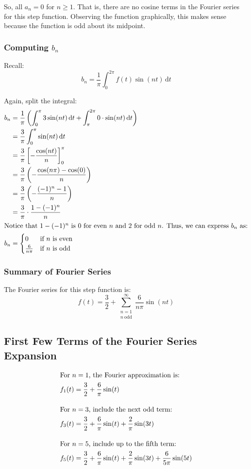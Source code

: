 \documentclass[10pt]{article} %
\begin{document}
So, all $a_n = 0$ for $n \geq 1$. That is, there are no cosine terms in the Fourier series for this step function. Observing the function graphically, this makes sense because the function is odd about its midpoint.

\subsubsection{Computing $b_n$}

Recall:
\[
b_n = \frac{1}{\pi}\int_0^{2\pi} f(t)\sin(nt)\,\mathrm{d}t
\]

Again, split the integral:
\begin{align*}
b_n &= \frac{1}{\pi} \left( \int_0^{\pi} 3\sin(nt)\,\mathrm{d}t + \int_{\pi}^{2\pi} 0\cdot\sin(nt)\,\mathrm{d}t \right) \\
    &= \frac{3}{\pi} \int_0^{\pi} \sin(nt)\,\mathrm{d}t \\
    &= \frac{3}{\pi} \left[ -\frac{\cos(nt)}{n} \right]_0^{\pi} \\
    &= \frac{3}{\pi} \left( -\frac{\cos(n\pi) - \cos(0)}{n} \right) \\
    &= \frac{3}{\pi} \left( -\frac{(-1)^n - 1}{n} \right) \\
    &= \frac{3}{\pi} \cdot \frac{1 - (-1)^n}{n} \\
    \intertext{Notice that $1 - (-1)^n$ is $0$ for even $n$ and $2$ for odd $n$. Thus, we can express $b_n$ as:}
    b_n &= 
    \begin{cases}
        0 & \text{if $n$ is even} \\
        \frac{6}{n\pi} & \text{if $n$ is odd}
    \end{cases}
\end{align*}


\subsubsection{Summary of Fourier Series}

The Fourier series for this step function is:
\[
f(t) = \frac{3}{2} + \sum_{\substack{n=1 \\ n\ \text{odd}}}^{\infty} \frac{6}{n\pi} \sin(nt)
\]

\subsection{First Few Terms of the Fourier Series Expansion}

\begin{align*}
    \intertext{For $n = 1$, the Fourier approximation is:}
    f_1(t) &= \frac{3}{2} + \frac{6}{\pi} \sin(t) \\[1em]
    \intertext{For $n = 3$, include the next odd term:}
    f_3(t) &= \frac{3}{2} + \frac{6}{\pi} \sin(t) + \frac{2}{\pi} \sin(3t) \\[1em]
    \intertext{For $n = 5$, include up to the fifth term:}
    f_5(t) &= \frac{3}{2} + \frac{6}{\pi} \sin(t) + \frac{2}{\pi} \sin(3t) + \frac{6}{5\pi} \sin(5t)
\end{align*}
\end{document}
